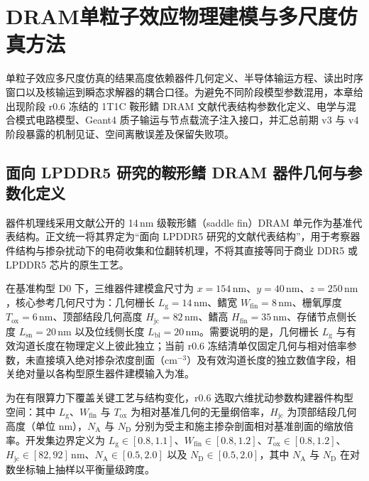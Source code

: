 \section{DRAM单粒子效应物理建模与多尺度仿真方法}
\label{sec:ch02-modeling}

单粒子效应多尺度仿真的结果高度依赖器件几何定义、半导体输运方程、读出时序窗口以及核输运到瞬态求解器的耦合口径。为避免不同阶段模型参数混用，本章给出现阶段 r0.6 冻结的 1T1C 鞍形鳍 DRAM 文献代表结构参数化定义、电学与混合模式电路模型、Geant4 质子输运与节点载流子注入接口，并汇总前期 v3 与 v4 阶段暴露的机制见证、空间离散误差及保留失败项。

\subsection{面向 LPDDR5 研究的鞍形鳍 DRAM 器件几何与参数化定义}
\label{subsec:ch02-device-geometry}

器件机理线采用文献公开的 14\,nm 级鞍形鳍（saddle fin）DRAM 单元作为基准代表结构\cite{han2019saddlefin,ryu2025cryogenicdram}。正文统一将其界定为“面向 LPDDR5 研究的文献代表结构”，用于考察器件结构与掺杂扰动下的电荷收集和位翻转机理，不将其直接等同于商业 DDR5 或 LPDDR5 芯片的原生工艺。

在基准构型 D0 下，三维器件建模盒尺寸为 $x=154\,\mathrm{nm}$、$y=40\,\mathrm{nm}$、$z=250\,\mathrm{nm}$，核心参考几何尺寸为：几何栅长 $L_{\mathrm{g}}=14\,\mathrm{nm}$、鳍宽 $W_{\mathrm{fin}}=8\,\mathrm{nm}$、栅氧厚度 $T_{\mathrm{ox}}=6\,\mathrm{nm}$、顶部结段几何高度 $H_{\mathrm{jc}}=82\,\mathrm{nm}$、鳍高 $H_{\mathrm{fin}}=35\,\mathrm{nm}$、存储节点侧长度 $L_{\mathrm{sn}}=20\,\mathrm{nm}$ 以及位线侧长度 $L_{\mathrm{bl}}=20\,\mathrm{nm}$。需要说明的是，几何栅长 $L_{\mathrm{g}}$ 与有效沟道长度在物理定义上彼此独立；当前 r0.6 冻结清单仅固定几何与相对倍率参数，未直接填入绝对掺杂浓度剖面（$\mathrm{cm}^{-3}$）及有效沟道长度的独立数值字段，相关绝对量以各构型原生器件建模输入为准。

为在有限算力下覆盖关键工艺与结构变化，r0.6 选取六维扰动参数构建器件构型空间：其中 $L_{\mathrm{g}}$、$W_{\mathrm{fin}}$ 与 $T_{\mathrm{ox}}$ 为相对基准几何的无量纲倍率，$H_{\mathrm{jc}}$ 为顶部结段几何高度（单位 nm），$N_{\mathrm{A}}$ 与 $N_{\mathrm{D}}$ 分别为受主和施主掺杂剖面相对基准剖面的缩放倍率。开发集边界定义为 $L_{\mathrm{g}}\in[0.8, 1.1]$、$W_{\mathrm{fin}}\in[0.8, 1.2]$、$T_{\mathrm{ox}}\in[0.8, 1.2]$、$H_{\mathrm{jc}}\in[82, 92]\,\mathrm{nm}$、$N_{\mathrm{A}}\in[0.5, 2.0]$ 以及 $N_{\mathrm{D}}\in[0.5, 2.0]$，其中 $N_{\mathrm{A}}$ 与 $N_{\mathrm{D}}$ 在对数坐标轴上抽样以平衡量级跨度。

